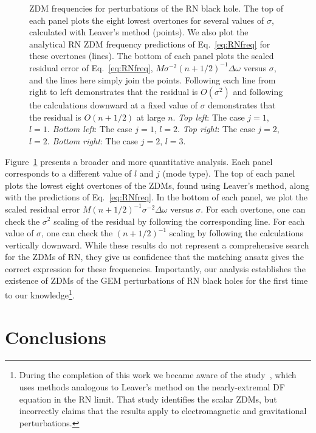 \begin{refsection}
\begin{figure}[tb]
\vspace{-5mm}
\caption{ZDM frequencies for perturbations of the RN black hole. The top of each panel plots the eight lowest overtones for several values of $\sigma$, calculated with Leaver's method (points). We also plot the analytical RN ZDM frequency predictions of Eq.~\eqref{eq:RNfreq} for these overtones (lines). The bottom of each panel plots the scaled residual error of Eq.~\eqref{eq:RNfreq}, $M\sigma^{-2}(n+1/2)^{-1}\Delta \omega$ versus $\sigma$, and the lines here simply join the points. 
Following each line from right to left demonstrates that the residual is $O(\sigma^2)$ and following the calculations downward at a fixed value of $\sigma$ demonstrates that the residual is $O(n+1/2)$ at large $n$. 
{\it Top left}: The case  $j=1$, $l=1$. {\it Bottom left}: The case $j =1$, $l = 2$. {\it Top right}: The case $j = 2$, $l=2$. {\it Bottom right}: The case $j = 2$, $l=3$.}
\label{fig:slRN}
\end{figure}

Figure~\ref{fig:slRN} presents a broader and more quantitative analysis. Each panel corresponds to a different value of $l$ and $j$ (mode type). The top of each panel plots the lowest eight overtones of the ZDMs, found using Leaver's method, along with the predictions of Eq.~\eqref{eq:RNfreq}. In the bottom of each panel, we plot the scaled residual error $M(n+1/2)^{-1}\sigma^{-2}\Delta\omega$ versus $\sigma$. For each overtone, one can check the $\sigma^2$ scaling of the residual by following the corresponding line. For each value of $\sigma$, one can check the $(n+1/2)^{-1}$ scaling by following the calculations vertically downward. 
While these results do not represent a comprehensive search for the ZDMs of RN, they give us confidence that the matching ansatz gives the correct expression for these frequencies. Importantly, our analysis establishes the existence of ZDMs of the GEM perturbations of RN black holes for the first time to our 
knowledge\footnote{During the completion of this work we became aware of the study~\cite{Couch:2012zz}, which uses methods analogous to Leaver's method on the nearly-extremal DF equation in the RN limit. That study identifies the scalar ZDMs, but incorrectly claims that the results apply to electromagnetic and gravitational perturbations.}.

\section{Conclusions}
\label{sec:Conclusions}


\end{refsection}
